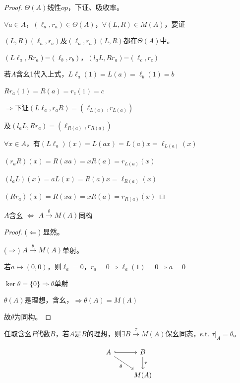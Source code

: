 \documentclass[lang=cn,a4paper,newtx,section]{elegantbook}
\begin{document}
\begin{proof}
  $\Theta(A)$线性$op$，下证、吸收率。
  
  $\forall a \in A$，$(\ell_a, r_a) \in \Theta(A)$，$\forall (L, R) \in M(A)$，要证
  
  $(L, R)(\ell_a, r_a)$及$(\ell_a, r_a)(L, R)$都在$\Theta(A)$中。
  
  $(L \ell_a, R r_a)$=$(\ell_b, r_b)$，$(l_a L, R r_a)$=$(\ell_c, r_c)$
  
  若$A$含幺1代入上式，$L\ell_a(1) =L(a)= \ell_b(1) = b$
  
  $R r_a(1) = R(a)= r_c(1) = c$
  
  $\Rightarrow$下证$(L \ell_a, r_a R) = (\ell_{L(a)}, r_{L(a)})$
  
  及$(l_a L, R r_a) = (\ell_{R(a)}, r_{R(a)})$
  
  $\forall x \in A$，有$(L \ell_a)(x) = L(ax) = L(a) x = \ell_{L(a)}(x)$
  
  $(r_a R)(x) = R(xa) = x R(a) = r_{L(a)}(x)$
  
  $(l_a L)(x) = a L(x) = R(a)x = \ell_{R(a)}(x)$
  
  $(R r_a)(x) = R(xa) = x R(a) = r_{R(a)}(x)$
\end{proof}

\begin{proposition}
  $A$含幺 $\Leftrightarrow$ $A \xrightarrow{\theta} M(A)$同构
\end{proposition}

\begin{proof}
  ($\Leftarrow$) 显然。
  
  ($\Rightarrow$) $A \xrightarrow{\theta} M(A)$单射。
  
  若$a \longmapsto (0, 0)$，则$\ell_a = 0$，$r_a = 0$$\Rightarrow \ell_a(1) = 0 \Rightarrow a = 0$
  
  $\ker \theta = \{0\} \Rightarrow \theta$单射
  
  $\theta(A)$是理想，含幺，$\Rightarrow \theta(A) = M(A)$
  
  故$\theta$为同构。
\end{proof}

\begin{theorem}
  任取含幺$F$代数$B$，若$A$是$B$的理想，则$\exists B \xrightarrow{\tau} M(A)$保幺同态，s.t. $\tau|_A = \theta$。
  
  \begin{equation*}
    \begin{tikzcd}
      A \arrow[r, hook] \arrow[dr, "\theta"'] & B \arrow[d, "\tau"] \\
      & M(A)
    \end{tikzcd}
  \end{equation*}
\end{theorem}
\end{document}
